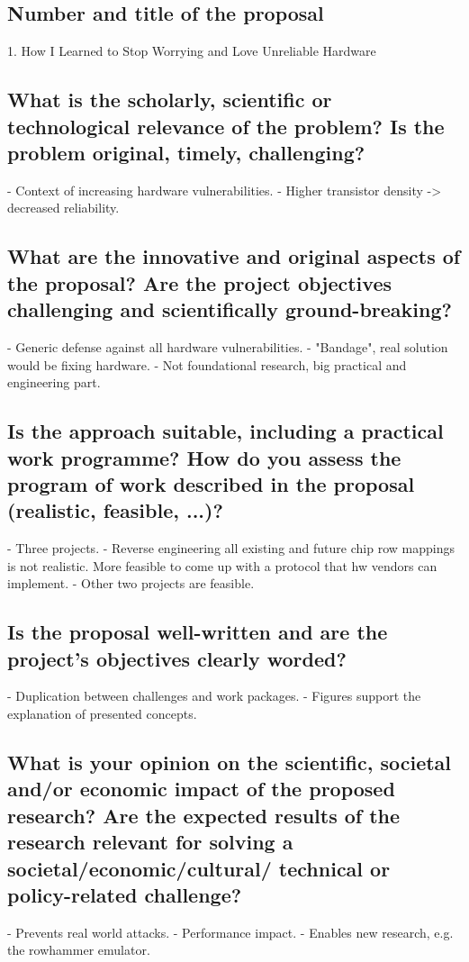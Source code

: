 \subsection*{Number and title of the proposal}
1. How I Learned to Stop Worrying and Love Unreliable Hardware

\subsection*{What is the scholarly, scientific or technological relevance of the problem? Is the problem original, timely, challenging?}
- Context of increasing hardware vulnerabilities.
- Higher transistor density -> decreased reliability.

\subsection*{What are the innovative and original aspects of the proposal? Are the project objectives challenging and scientifically ground-breaking?}
- Generic defense against all hardware vulnerabilities.
- "Bandage", real solution would be fixing hardware.
- Not foundational research, big practical and engineering part.

\subsection*{Is the approach suitable, including a practical work programme? How do you assess the program of work described in the proposal (realistic, feasible, ...)?}
- Three projects.
- Reverse engineering all existing and future chip row mappings is not realistic. More feasible to come up with a protocol that hw vendors can implement.
- Other two projects are feasible.

\subsection*{Is the proposal well-written and are the project’s objectives clearly worded?}
- Duplication between challenges and work packages.
- Figures support the explanation of presented concepts.

\subsection*{What is your opinion on the scientific, societal and/or economic impact of the proposed research? Are the expected results of the research relevant for solving a societal/economic/cultural/ technical or policy-related challenge?}
- Prevents real world attacks.
- Performance impact.
- Enables new research, e.g. the rowhammer emulator.

